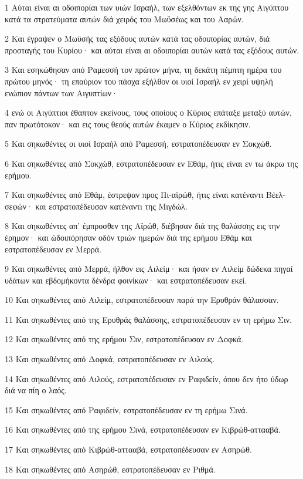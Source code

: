 \par 1 Αύται είναι αι οδοιπορίαι των υιών Ισραήλ, των εξελθόντων εκ της γης Αιγύπτου κατά τα στρατεύματα αυτών διά χειρός του Μωϋσέως και του Ααρών.
\par 2 Και έγραψεν ο Μωϋσής τας εξόδους αυτών κατά τας οδοιπορίας αυτών, διά προσταγής του Κυρίου· και αύται είναι αι οδοιπορίαι αυτών κατά τας εξόδους αυτών.
\par 3 Και εσηκώθησαν από Ραμεσσή τον πρώτον μήνα, τη δεκάτη πέμπτη ημέρα του πρώτου μηνός· τη επαύριον του πάσχα εξήλθον οι υιοί Ισραήλ εν χειρί υψηλή ενώπιον πάντων των Αιγυπτίων·
\par 4 ενώ οι Αιγύπτιοι έθαπτον εκείνους, τους οποίους ο Κύριος επάταξε μεταξύ αυτών, παν πρωτότοκον· και εις τους θεούς αυτών έκαμεν ο Κύριος εκδίκησιν.
\par 5 Και σηκωθέντες οι υιοί Ισραήλ από Ραμεσσή, εστρατοπέδευσαν εν Σοκχώθ.
\par 6 Και σηκωθέντες από Σοκχώθ, εστρατοπέδευσαν εν Εθάμ, ήτις είναι εν τω άκρω της ερήμου.
\par 7 Και σηκωθέντες από Εθάμ, έστρεψαν προς Πι-αϊρώθ, ήτις είναι κατέναντι Βέελ-σεφών· και εστρατοπέδευσαν κατέναντι της Μιγδώλ.
\par 8 Και σηκωθέντες απ' έμπροσθεν της Αϊρώθ, διέβησαν διά της θαλάσσης εις την έρημον· και ώδοιπόρησαν οδόν τριών ημερών διά της ερήμου Εθάμ και εστρατοπέδευσαν εν Μερρά.
\par 9 Και σηκωθέντες από Μερρά, ήλθον εις Αιλείμ· και ήσαν εν Αιλείμ δώδεκα πηγαί υδάτων και εβδομήκοντα δένδρα φοινίκων· και εστρατοπέδευσαν εκεί.
\par 10 Και σηκωθέντες από Αιλείμ, εστρατοπέδευσαν παρά την Ερυθράν θάλασσαν.
\par 11 Και σηκωθέντες από της Ερυθράς θαλάσσης, εστρατοπέδευσαν εν τη ερήμω Σιν.
\par 12 Και σηκωθέντες από της ερήμου Σιν, εστρατοπέδευσαν εν Δοφκά.
\par 13 Και σηκωθέντες από Δοφκά, εστρατοπέδευσαν εν Αιλούς.
\par 14 Και σηκωθέντες από Αιλούς, εστρατοπέδευσαν εν Ραφιδείν, όπου δεν ήτο ύδωρ διά να πίη ο λαός.
\par 15 Και σηκωθέντες από Ραφιδείν, εστρατοπέδευσαν εν τη ερήμω Σινά.
\par 16 Και σηκωθέντες από της ερήμου Σινά, εστρατοπέδευσαν εν Κιβρώθ-αττααβά.
\par 17 Και σηκωθέντες από Κιβρώθ-αττααβά, εστρατοπέδευσαν εν Ασηρώθ.
\par 18 Και σηκωθέντες από Ασηρώθ, εστρατοπέδευσαν εν Ριθμά.

